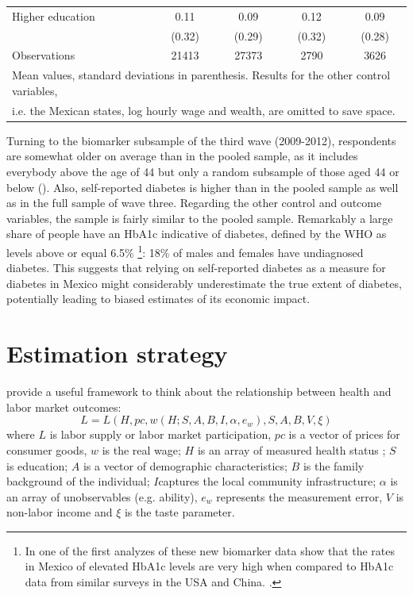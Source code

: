 \documentclass[12pt,english]{article}
\begin{document}
{\begin{table}[!ht]
\begin{center}
\begin{adjustbox}{max width=\textwidth}
{\begin{tabular}{l*{4}{c}}
Higher education    &        0.11&        0.09&        0.12&        0.09\\
                    &      (0.32)&      (0.29)&      (0.32)&      (0.28)\\
\midrule
Observations        &       21413&       27373&        2790&        3626\\
\bottomrule
\multicolumn{5}{l}{\footnotesize Mean values, standard deviations in parenthesis. Results for the other control variables,}\\
\multicolumn{5}{l}{\footnotesize i.e. the Mexican states, log hourly wage and wealth, are omitted to save space.}
\end{tabular}
}
\end{adjustbox}
\end{center}
\end{table}


\FloatBarrier
Turning to the biomarker subsample of the third wave (2009-2012), respondents are somewhat older on average than in the pooled sample, as it includes everybody above the age of 44 but only a random subsample of those aged 44 or below (\cite{Crimmins2015}). Also, self-reported diabetes is higher than in the pooled sample as well as in the full sample of wave three. Regarding the other control and outcome variables, the sample is fairly similar to the pooled sample. Remarkably a large share of people have an \ac{HbA1c} indicative of diabetes, defined by the \ac{WHO} as levels above or equal 6.5\% \parencite{WorldHealthOrganization2011}\footnote{In one of the first analyzes of these new biomarker data \textcite{Frankenberg2015} show that the rates in Mexico of elevated \ac{HbA1c} levels are very high when compared to \ac{HbA1c} data from similar surveys in the \ac{USA} and China. \parencite{Frankenberg2015}.}: 18\% of males and females have undiagnosed diabetes. This suggests that relying on self-reported diabetes as a measure for diabetes in Mexico might considerably underestimate the true extent of diabetes, potentially leading to biased estimates of its economic impact.

\section{\label{sec:Estimation Strategy}Estimation strategy}
 
\textcite{Strauss1998} provide a useful framework to think about the relationship between health and labor market outcomes:
\begin{equation}
L=L(H, pc, w(H;S,A,B,I,\alpha,e_{w}), S, A, B, V, \xi) \label{eq:wage}
\end{equation}
where $L$ is labor supply or labor market participation, $pc $ is a vector of prices for consumer goods, $w$ is the real wage; $H$ is an array of measured health status ; $S$ is education; $A$ is a vector of demographic characteristics; $B$ is the family background of the individual; $I$captures the local community infrastructure; $\alpha$ is an array of unobservables (e.g. ability), $e_w$ represents the measurement error, $V$ is non-labor income and $\xi$ is the taste parameter. 

}
\end{document}
